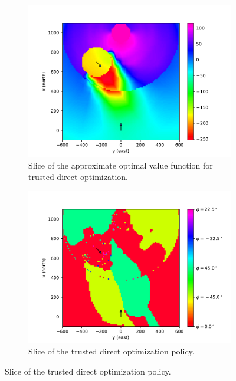 \begin{figure}[p]
    \begin{subfigure}[t]{0.48\textwidth}
        \includegraphics[width=\columnwidth]{media/tdovalue.pdf}
        \caption{Slice of the approximate optimal value function for trusted direct optimization.}
        \label{fig:tdovalue}
    \end{subfigure}
    \hfill
    \begin{subfigure}[t]{0.48\textwidth}
        \includegraphics[width=\columnwidth]{media/tdopolicy.pdf}
        \caption{Slice of the trusted direct optimization policy.}
        \label{fig:tdopolicy}
    \end{subfigure}


\end{figure}
